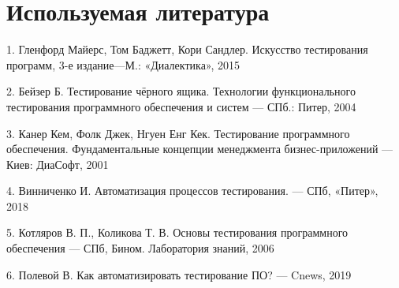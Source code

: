 \documentclass[12pt]{article}
\begin{document}
    \section*{Используемая литература}

    1. Гленфорд Майерс, Том Баджетт, Кори Сандлер. Искусство тестирования программ, 3-е издание—М.: «Диалектика», 2015

    2. Бейзер Б. Тестирование чёрного ящика. Технологии функционального тестирования программного обеспечения и систем --- СПб.: Питер, 2004

    3. Канер Кем, Фолк Джек, Нгуен Енг Кек. Тестирование программного обеспечения. Фундаментальные концепции менеджмента бизнес-приложений --- Киев: ДиаСофт, 2001

    4. Винниченко И. Автоматизация процессов тестирования. --- СПб, «Питер», 2018

    5. Котляров В. П., Коликова Т. В. Основы тестирования программного обеспечения --- СПб, Бином. Лаборатория знаний, 2006

    6. Полевой В. Как автоматизировать тестирование ПО? --- Cnews, 2019
\end{document}

